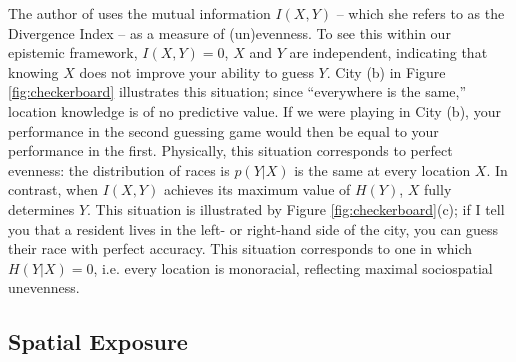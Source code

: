 \documentclass[english]{scrartcl}
\begin{document}
		The author of \cite{Roberto2015a} uses the mutual information $I(X,Y)$ -- which she refers to as the Divergence Index -- as a measure of (un)evenness. To see this within our epistemic framework, $I(X,Y) = 0$, $X$ and $Y$ are independent, indicating that knowing $X$ does not improve your ability to guess $Y$. City (b) in Figure \ref{fig:checkerboard} illustrates this situation; since ``everywhere is the same,'' location knowledge is of no predictive value. If we were playing in City (b), your performance in the second guessing game would then be equal to your performance in the first. Physically, this situation corresponds to perfect evenness: the distribution of races is $p(Y|X)$ is the same at every location $X$. In contrast, when $I(X,Y)$ achieves its maximum value of $H(Y)$, $X$ fully determines $Y$. This situation is illustrated by Figure \ref{fig:checkerboard}(c); if I tell you that a resident lives in the left- or right-hand side of the city, you can guess their race with perfect accuracy. This situation corresponds to one in which $H(Y|X) = 0$, i.e. every location is monoracial, reflecting maximal sociospatial unevenness. 

	\subsection{Spatial Exposure}
\end{document}
